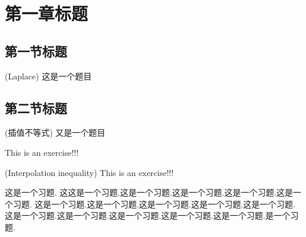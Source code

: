 \documentclass[withinsec]{mathexercise}
\begin{document}
\chapter{第一章标题}



\section{第一节标题}
\begin{exercise}[2](Laplace)
    这是一个题目
\end{exercise}


\section{第二节标题}

\begin{exercise}(插值不等式)
    又是一个题目
\end{exercise}

\begin{exercise}
    This is an exercise!!!
\end{exercise}

\begin{exercise}(Interpolation inequality)
    This is an exercise!!!
\end{exercise}

\begin{exercise}[11]
    这是一个习题. 这这是一个习题.这是一个习题.这是一个习题.这是一个习题.这是一个习题.
    这是一个习题.这是一个习题.这是一个习题.这是一个习题.这是一个习题.
    这是一个习题.这是一个习题.这是一个习题.这是一个习题.这是一个习题.是一个习题.
\end{exercise}
\end{document}
